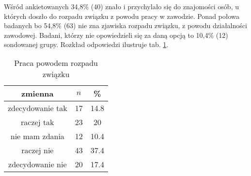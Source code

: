 

Wśród ankietowanych 34,8\% (40) znało i przychylało się do znajomości osób, u których doszło do rozpadu związku z powodu pracy w zawodzie. Ponad połowa badanych bo 54,8\% (63) nie zna zjawiska rozpadu związku, z powodu działalności zawodowej. Badani, którzy nie opowiedzieli się za daną opcją to 10,4\% (12) sondowanej grupy. Rozkład odpowiedzi ilustruje tab. \ref{tab:Q29}.

\begin{table}[H]
\caption{Praca powodem rozpadu związku}
\centering
\begin{tabular}{ | c | c | c |}
\hline
zmienna & $n$ & \% \\
\hline
zdecydowanie tak  &  17  & 14.8 \\
\hline
raczej tak  &  23  & 20 \\
\hline
nie mam zdania  &  12  & 10.4\\
\hline
raczej nie  &  43  & 37.4\\
\hline
zdecydowanie nie  &  20  & 17.4 \\
\hline
\end{tabular}
\label{tab:Q29}
\end{table}
